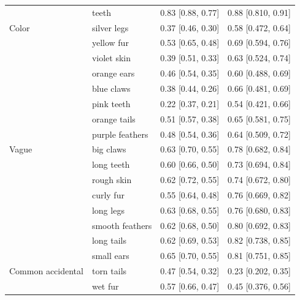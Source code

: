 \documentclass[12pt,letterpaper]{article}
\begin{document}
\begin{table}[h]
\begin{tabular}{| l || l | l | l |}
                  & teeth              & 0.83 {[}0.88, 0.77{]}   & 0.88 {[}0.810, 0.91{]}       \\
Color             & silver legs        & 0.37 {[}0.46, 0.30{]}   & 0.58 {[}0.472, 0.64{]}       \\
                  & yellow fur         & 0.53 {[}0.65, 0.48{]}   & 0.69 {[}0.594, 0.76{]}       \\
                  & violet skin        & 0.39 {[}0.51, 0.33{]}   & 0.63 {[}0.524, 0.74{]}       \\
                  & orange ears        & 0.46 {[}0.54, 0.35{]}   & 0.60 {[}0.488, 0.69{]}       \\
                  & blue claws         & 0.38 {[}0.44, 0.26{]}   & 0.66 {[}0.481, 0.69{]}       \\
                  & pink teeth         & 0.22 {[}0.37, 0.21{]}   & 0.54 {[}0.421, 0.66{]}       \\
                  & orange tails       & 0.51 {[}0.57, 0.38{]}   & 0.65 {[}0.581, 0.75{]}       \\
                  & purple feathers    & 0.48 {[}0.54, 0.36{]}   & 0.64 {[}0.509, 0.72{]}       \\
Vague             & big claws          & 0.63 {[}0.70, 0.55{]}   & 0.78 {[}0.682, 0.84{]}       \\
                  & long teeth         & 0.60 {[}0.66, 0.50{]}   & 0.73 {[}0.694, 0.84{]}       \\
                  & rough skin         & 0.62 {[}0.72, 0.55{]}   & 0.74 {[}0.672, 0.80{]}       \\
                  & curly fur          & 0.55 {[}0.64, 0.48{]}   & 0.76 {[}0.669, 0.82{]}       \\
                  & long legs          & 0.63 {[}0.68, 0.55{]}   & 0.76 {[}0.680, 0.83{]}       \\
                  & smooth feathers    & 0.62 {[}0.68, 0.50{]}   & 0.80 {[}0.692, 0.83{]}       \\
                  & long tails         & 0.62 {[}0.69, 0.53{]}   & 0.82 {[}0.738, 0.85{]}       \\
                  & small ears         & 0.65 {[}0.70, 0.55{]}   & 0.81 {[}0.751, 0.85{]}       \\
Common accidental & torn tails         & 0.47 {[}0.54, 0.32{]}   & 0.23 {[}0.202, 0.35{]}       \\
                  & wet fur            & 0.57 {[}0.66, 0.47{]}   & 0.45 {[}0.376, 0.56{]}       \\

\end{tabular}
\end{table}
\end{document}
